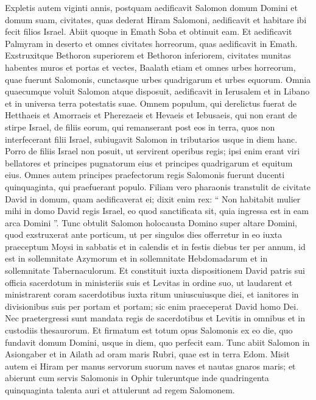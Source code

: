 \begin{biblechapter}
\begin{biblechapter}
\begin{biblechapter}
\begin{biblechapter}
\begin{biblechapter}
\begin{biblechapter}
\begin{biblechapter}
\begin{biblechapter}
\verse Expletis autem viginti annis, postquam aedificavit Salomon domum Domini et domum suam, 
\verse civitates, quas dederat Hiram Salomoni, aedificavit et habitare ibi fecit filios Israel.
 \verse Abiit quoque in Emath Soba et obtinuit eam. 
\verse Et aedificavit Palmyram in deserto et omnes civitates horreorum, quas aedificavit in Emath. 
\verse Exstruxitque Bethoron superiorem et Bethoron inferiorem, civitates munitas habentes muros et portas et vectes, 
\verse Baalath etiam et omnes urbes horreorum, quae fuerunt Salomonis, cunctasque urbes quadrigarum et urbes equorum. Omnia quaecumque voluit Salomon atque disposuit, aedificavit in Ierusalem et in Libano et in universa terra potestatis suae.
 \verse Omnem populum, qui derelictus fuerat de Hetthaeis et Amorraeis et Pherezaeis et Hevaeis et Iebusaeis, qui non erant de stirpe Israel, 
\verse de filiis eorum, qui remanserant post eos in terra, quos non interfecerant filii Israel, subiugavit Salomon in tributarios usque in diem hanc. 
\verse Porro de filiis Israel non posuit, ut servirent operibus regis; ipsi enim erant viri bellatores et principes pugnatorum eius et principes quadrigarum et equitum eius. 
\verse Omnes autem principes praefectorum regis Salomonis fuerunt ducenti quinquaginta, qui praefuerant populo.
 \verse Filiam vero pharaonis transtulit de civitate David in domum, quam aedificaverat ei; dixit enim rex: “ Non habitabit mulier mihi in domo David regis Israel, eo quod sanctificata sit, quia ingressa est in eam arca Domini ”.
 \verse Tunc obtulit Salomon holocausta Domino super altare Domini, quod exstruxerat ante porticum, 
\verse ut per singulos dies offerretur in eo iuxta praeceptum Moysi in sabbatis et in calendis et in festis diebus ter per annum, id est in sollemnitate Azymorum et in sollemnitate Hebdomadarum et in sollemnitate Tabernaculorum. 
\verse Et constituit iuxta dispositionem David patris sui officia sacerdotum in ministeriis suis et Levitas in ordine suo, ut laudarent et ministrarent coram sacerdotibus iuxta ritum uniuscuiusque diei, et ianitores in divisionibus suis per portam et portam; sic enim praeceperat David homo Dei. 
 \verse Nec praetergressi sunt mandata regis de sacerdotibus et Levitis in omnibus et in custodiis thesaurorum.
 \verse Et firmatum est totum opus Salomonis ex eo die, quo fundavit domum Domini, usque in diem, quo perfecit eam.
 \verse Tunc abiit Salomon in Asiongaber et in Ailath ad oram maris Rubri, quae est in terra Edom. 
\verse Misit autem ei Hiram per manus servorum suorum naves et nautas gnaros maris; et abierunt cum servis Salomonis in Ophir tuleruntque inde quadringenta quinquaginta talenta auri et attulerunt ad regem Salomonem.
 

\end{biblechapter}
\end{biblechapter}
\end{biblechapter}
\end{biblechapter}
\end{biblechapter}
\end{biblechapter}
\end{biblechapter}
\end{biblechapter}
